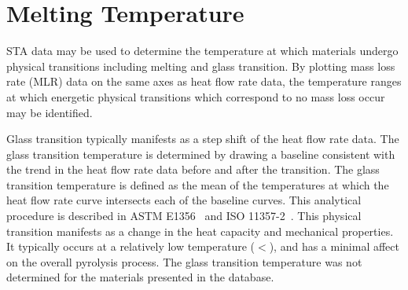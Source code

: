 \documentclass[12pt,oneside]{book}
\begin{document}
\begin{table}[!ht]{}
\centering
\caption[Kinetic Parameters Determined for Anaerobic Decomposition of Masonite]{Kinetic Parameters Determined for Anaerobic Decomposition of Masonite (subscripts indicate the reaction number)}
\label{tab:masonite_kinetics}
\end{table}

\section{Melting Temperature}

STA data may be used to determine the temperature at which materials undergo physical transitions including melting and glass transition. By plotting mass loss rate (MLR) data on the same axes as heat flow rate data, the temperature ranges at which energetic physical transitions which correspond to no mass loss occur may be identified. 

Glass transition typically manifests as a step shift of the heat flow rate data. The glass transition temperature is determined by drawing a baseline consistent with the trend in the heat flow rate data before and after the transition. The glass transition temperature is defined as the mean of the temperatures at which the heat flow rate curve intersects each of the baseline curves. This analytical procedure is described in ASTM E1356~\cite{ASTM_E1356} and ISO 11357-2~\cite{ISO_11357-2}. This physical transition manifests as a change in the heat capacity and mechanical properties. It typically occurs at a relatively low temperature ($<$), and has a minimal affect on the overall pyrolysis process. The glass transition temperature was not determined for the materials presented in the database.
\end{document}
